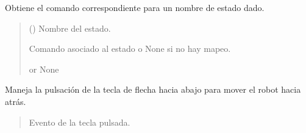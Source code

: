 \documentclass[a4paper,10pt,spanish]{sphinxmanual}
\begin{document}
\begin{fulllineitems}
\begin{fulllineitems}
\begin{quote}
\begin{description}
\end{description}\end{quote}

\end{fulllineitems}


\begin{fulllineitems}
\label{\detokenize{squad_state_manager:squad_state_manager.InterfazManager.get_command_for_state}}
\pysigstartsignatures
{}
\pysigstopsignatures
\sphinxAtStartPar
Obtiene el comando correspondiente para un nombre de estado dado.
\begin{quote}\begin{description}
\sphinxAtStartPar
{} () \textendash{} Nombre del estado.

\sphinxAtStartPar
Comando asociado al estado o None si no hay mapeo.

\sphinxAtStartPar
{} or None

\end{description}\end{quote}

\end{fulllineitems}


\begin{fulllineitems}
\label{\detokenize{squad_state_manager:squad_state_manager.InterfazManager.on_arrow_down}}
\pysigstartsignatures
{}
\pysigstopsignatures
\sphinxAtStartPar
Maneja la pulsación de la tecla de flecha hacia abajo para mover el robot hacia atrás.
\begin{quote}\begin{description}
\sphinxAtStartPar
{} \textendash{} Evento de la tecla pulsada.


\end{description}
\end{quote}
\end{fulllineitems}
\end{fulllineitems}
\end{document}
